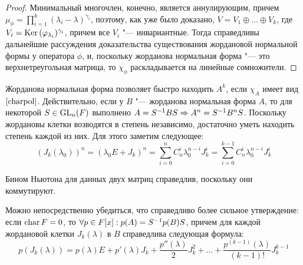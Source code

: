 \begin{proof}
	Минимальный многочлен, конечно, является аннулирующим, причем $\mu_\phi = \prod_{i = 1}^k(\lambda_i - \lambda)^{\gamma_i}$, поэтому, как уже было доказано, $V = V_1 \oplus \dots \oplus V_k$, где $V_i = \operatorname{Ker}{(\varphi_{\lambda_i})^{\gamma_i}}$, причем все $V_i$ "--- инвариантные. Тогда справедливы дальнейшие рассуждения доказательства существования жордановой нормальной формы у оператора $\phi$, и, поскольку жорданова нормальная форма "--- это верхнетреугольная матрица, то $\chi_\phi$ раскладывается на линейные сомножители.
\end{proof}

\begin{note}
	Жорданова нормальная форма позволяет быстро находить $A^k$, если $\chi_A$ имеет вид $\eqref*{charpol}$. Действительно, если у $B$ "--- жорданова нормальная форма $A$, то для некоторой $S \in \operatorname{GL}_n(F)$ выполнено $A \hm{=} S^{-1}BS \hm{\Rightarrow} A^n = S^{-1}B^nS$. Поскольку жордановы клетки возводятся в степень независимо, достаточно уметь находить степень каждой из них. Для этого заметим следующее:
	\[(J_k(\lambda_0))^n = (\lambda_0E + J_k)^n = \sum_{i = 0}^nC_n^i\lambda_0^{n - i}J_k^i = \sum_{i = 0}^{k - 1}C_n^i\lambda_0^{n - i}J_k^i\]
	
	Бином Ньютона для данных двух матриц справедлив, поскольку они коммутируют.
\end{note}

\begin{note}
	Можно непосредственно убедиться, что справедливо более сильное утверждение: если $\operatorname{char}{F} = 0$, то $\forall p \in F[x]: p(A) \hm{=} S^{-1}p(B)S$, причем для каждой жордановой клетки $J_k(\lambda)$ в $B$ справедлива следующая формула:
	\[p(J_k(\lambda)) = p(\lambda)E + p'(\lambda)J_k + \frac{p''(\lambda)}{2}J_k^2 + \dots + \frac{p^{(k-1)}(\lambda)}{(k-1)!}J_k^{k-1}\]
\end{note}